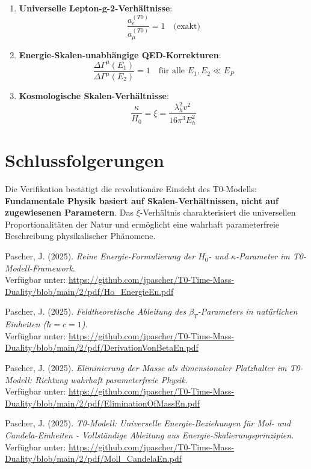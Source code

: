 \documentclass[12pt,a4paper]{article}
\begin{document}
	\begin{enumerate}
		\item \textbf{Universelle Lepton-g-2-Verhältnisse}: 
		\begin{equation}
			\frac{a_e^{(T0)}}{a_{\mu}^{(T0)}} = 1 \quad \text{(exakt)}
		\end{equation}
		
		\item \textbf{Energie-Skalen-unabhängige QED-Korrekturen}:
		\begin{equation}
			\frac{\Delta\Gamma^{\mu}(E_1)}{\Delta\Gamma^{\mu}(E_2)} = 1 \quad \text{für alle } E_1, E_2 \ll E_P
		\end{equation}
		
		\item \textbf{Kosmologische Skalen-Verhältnisse}:
		\begin{equation}
			\frac{\kappa}{H_0} = \xi = \frac{\lambda_h^2 v^2}{16\pi^3 E_h^2}
		\end{equation}
	\end{enumerate}
	
	\section{Schlussfolgerungen}
	
	Die Verifikation bestätigt die revolutionäre Einsicht des T0-Modells: \textbf{Fundamentale Physik basiert auf Skalen-Verhältnissen, nicht auf zugewiesenen Parametern}. Das $\xi$-Verhältnis charakterisiert die universellen Proportionalitäten der Natur und ermöglicht eine wahrhaft parameterfreie Beschreibung physikalischer Phänomene.
	
	\begin{thebibliography}{9}
		
		Pascher, J. (2025). \textit{Reine Energie-Formulierung der $H_0$- und $\kappa$-Parameter im T0-Modell-Framework}. \\
		Verfügbar unter: \url{https://github.com/jpascher/T0-Time-Mass-Duality/blob/main/2/pdf/Ho_EnergieEn.pdf}
		
		Pascher, J. (2025). \textit{Feldtheoretische Ableitung des $\beta_T$-Parameters in natürlichen Einheiten ($\hbar = c = 1$)}. \\
		Verfügbar unter: \url{https://github.com/jpascher/T0-Time-Mass-Duality/blob/main/2/pdf/DerivationVonBetaEn.pdf}
		
		Pascher, J. (2025). \textit{Eliminierung der Masse als dimensionaler Platzhalter im T0-Modell: Richtung wahrhaft parameterfreie Physik}. \\
		Verfügbar unter: \url{https://github.com/jpascher/T0-Time-Mass-Duality/blob/main/2/pdf/EliminationOfMassEn.pdf}
		
		Pascher, J. (2025). \textit{T0-Modell: Universelle Energie-Beziehungen für Mol- und Candela-Einheiten - Vollständige Ableitung aus Energie-Skalierungsprinzipien}. \\
		Verfügbar unter: \url{https://github.com/jpascher/T0-Time-Mass-Duality/blob/main/2/pdf/Moll_CandelaEn.pdf}
		
	\end{thebibliography}
	
\end{document}
